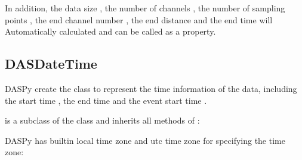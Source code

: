 \documentclass[letterpaper,10pt,english]{sphinxmanual}
\begin{document}
\sphinxAtStartPar
In addition, the data size , the number of channels , the number of sampling points , the end channel number , the end distance  and the end time  will Automatically calculated and can be called as a property.


\subsection{DASDateTime}
\label{\detokenize{Reading DAS Data:dasdatetime}}
\sphinxAtStartPar
DASPy create the  class to represent the time information of the data, including the start time , the end time  and the event start time .

\sphinxAtStartPar
{} is a subclass of the  class and inherits all methods of :

\begin{sphinxVerbatim}[commandchars=\\\{\}]
   
 
\end{sphinxVerbatim}

\sphinxAtStartPar
DASPy has built\sphinxhyphen{}in local time zone  and utc time zone  for specifying the time zone:

\begin{sphinxVerbatim}[commandchars=\\\{\}]
    
 
\end{sphinxVerbatim}
\end{document}
